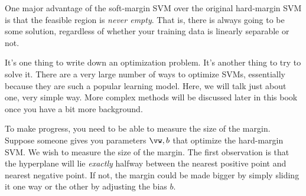 
One major advantage of the soft-margin SVM over the original
hard-margin SVM is that the feasible region is \emph{never empty}.
That is, there is always going to be some solution, regardless of
whether your training data is linearly separable or not.


It's one thing to write down an optimization problem.  It's another
thing to try to solve it.  There are a very large number of ways to
optimize SVMs, essentially because they are such a popular learning
model.  Here, we will talk just about one, very simple way.  More
complex methods will be discussed later in this book once you have a
bit more background.

To make progress, you need to be able to measure the size of the
margin.  Suppose someone gives you parameters $\vw,b$ that optimize
the hard-margin SVM.  We wish to measure the size of the margin.  The
first observation is that the hyperplane will lie \emph{exactly}
halfway between the nearest positive point and nearest negative point.
If not, the margin could be made bigger by simply sliding it one way
or the other by adjusting the bias $b$.


